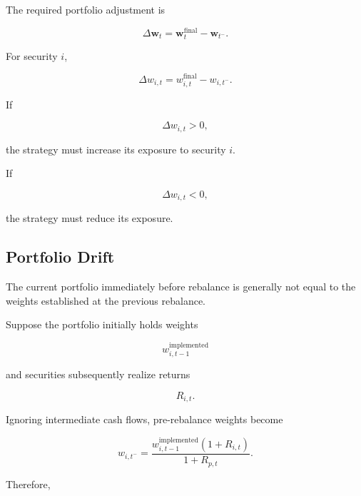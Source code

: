 \documentclass[11pt,a4paper]{article}
\begin{document}
The required portfolio adjustment is

\begin{equation}
\boxed{
\Delta\mathbf{w}_t
=
\mathbf{w}_t^{\mathrm{final}}
-
\mathbf{w}_{t^-}.
}
\end{equation}

For security $i$,

\begin{equation}
\Delta w_{i,t}
=
w_{i,t}^{\mathrm{final}}
-
w_{i,t^-}.
\end{equation}

If

\begin{equation}
\Delta w_{i,t}>0,
\end{equation}

the strategy must increase its exposure to security $i$.

If

\begin{equation}
\Delta w_{i,t}<0,
\end{equation}

the strategy must reduce its exposure.


\subsection{Portfolio Drift}

The current portfolio immediately before rebalance is generally not equal to the
weights established at the previous rebalance.

Suppose the portfolio initially holds weights

\begin{equation}
w_{i,t-1}^{\mathrm{implemented}}
\end{equation}

and securities subsequently realize returns

\begin{equation}
R_{i,t}.
\end{equation}

Ignoring intermediate cash flows, pre-rebalance weights become

\begin{equation}
\boxed{
w_{i,t^-}
=
\frac{
w_{i,t-1}^{\mathrm{implemented}}
(1+R_{i,t})
}{
1+R_{p,t}
}.
}
\end{equation}

Therefore,
\end{document}
